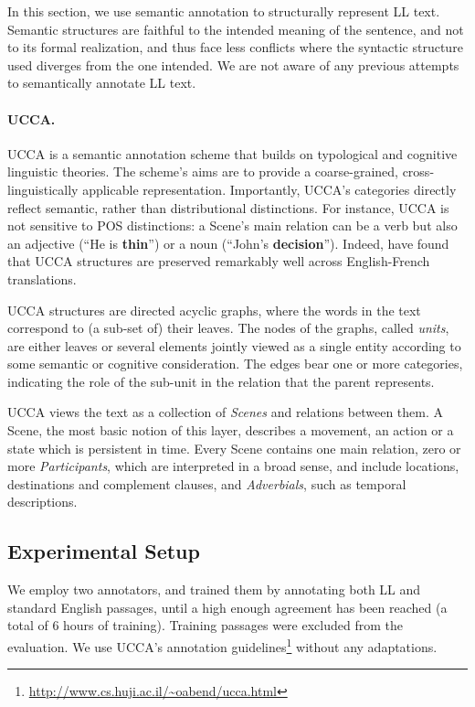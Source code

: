 \documentclass[letter,11pt]{article}
\begin{document}
In this section, we use semantic annotation to structurally
represent LL text. Semantic structures are faithful to the intended
meaning of the sentence, and not to its formal realization, and thus face
less conflicts where the syntactic structure used diverges from
the one intended. We are not aware of any previous attempts to semantically
annotate LL text.

\paragraph{UCCA.}\label{sec:ucca}
UCCA is a semantic annotation scheme that builds on
typological and cognitive linguistic theories.
The scheme's aims are to provide a coarse-grained, cross-linguistically
applicable representation.
Importantly, UCCA's categories directly reflect semantic, rather than
distributional distinctions.
For instance, UCCA is not sensitive to POS distinctions:
a Scene's main relation can be a verb but also an adjective
(``He is {\bf thin}'') or a noun (``John's {\bf decision}'').
Indeed,  have found that UCCA structures are
preserved remarkably well across English-French translations. 

UCCA structures are directed acyclic graphs, where the words in the text 
correspond to (a sub-set of) their leaves.
The nodes of the graphs, called {\it units}, are either leaves or several elements jointly
viewed as a single entity according to some semantic or cognitive consideration.
The edges bear one or more categories, indicating the role of 
the sub-unit in the relation that the parent represents.

UCCA views the text as a collection of {\it Scenes} and relations between them.
A Scene, the most basic notion of this layer, describes a movement, 
an action or a state which is persistent in time.
Every Scene contains one main relation, 
zero or more {\it Participants}, 
which are interpreted in a broad sense, 
and include locations, destinations and complement clauses,
and {\it Adverbials}, such as temporal descriptions.

\subsection{Experimental Setup}
We employ two annotators, and trained them by annotating both LL and standard English
passages, until a high enough agreement has been reached (a total of 6 hours of training).
Training passages were excluded from the evaluation.
We use UCCA's annotation guidelines\footnote{\url{http://www.cs.huji.ac.il/~oabend/ucca.html}} without any adaptations.
\end{document}
